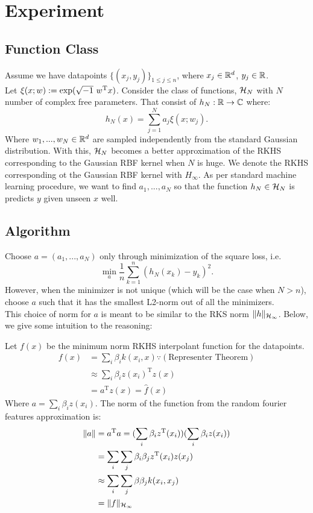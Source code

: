 \documentclass[twoside]{memoir}
\begin{document}
\section{Experiment} \label{sec:RFF_Exp}
\subsection{Function Class}
Assume we have datapoints $\{(x_j, y_j)\}_{1 \leq j \leq n}$, where $x_j \in \mathbb{R}^d$, $y_j \in \mathbb{R}$.\\
Let $\xi(x;w) := \exp(\sqrt{-1} ~ w^{\text{T}} x)$.
Consider the class of functions, $\mathcal{H}_N$ with $N$ number of complex free parameters. That consist of $h_N: \mathbb{R} \rightarrow \mathbb{C}$ where:
\[ h_N(x) = \sum_{j=1}^{N} a_j \xi(x;w_j). \]
Where $w_1,..., w_N \in \mathbb{R}^d$ are sampled independently from the standard Gaussian distribution. With this, $\mathcal{H}_N$ becomes a better approximation of the RKHS corresponding to the Gaussian RBF kernel when $N$ is huge. We denote the RKHS corresponding ot the Gaussian RBF kernel with $H_\infty$. As per standard machine learning procedure, we want to find $a_1, ..., a_N$ so that the function $h_N \in \mathcal{H}_N$ is predicts $y$ given unseen $x$ well.
\subsection{Algorithm}
Choose $a = (a_1,..., a_N)$ only through minimization of the square loss, i.e.
\[ \min_{a} \frac{1}{n} \sum_{k=1}^{n}(h_N(x_k) - y_k)^2. \]
However, when the minimizer is not unique (which will be the case when $N > n$), choose $a$ such that it has the smallest L2-norm out of all the minimizers. \\
This choice of norm for $a$ is meant to be similar to the RKS norm $\lVert h\rVert_{\mathcal{H}_\infty}$. Below, we give some intuition to the reasoning:

	Let $f(x)$ be the minimum norm RKHS interpolant function for the datapoints. 
	\begin{equation*}
	\begin{split}
	f(x) &= \sum_{i}\beta_ik(x_i, x)  \because(\text{Representer Theorem}) \\
	&\approx \sum_{i}\beta_iz(x_i)^\text{T}z(x) \\
	&= a^\text{T}z(x) = \hat{f}(x)
	\end{split}
	\end{equation*}
	Where $a = \sum_{i}\beta_iz(x_i) $.
	The norm of the function from the random fourier features approximation is:
	\begin{equation*}
	\begin{split}
	\lVert a\rVert &=   a^\text{T} a = 
	(\sum_{i}\beta_i z^\text{T}(x_i)) (\sum_{i}\beta_i z(x_i)) \\
	&= \sum_i \sum_j \beta_i \beta_j z^\text{T}(x_i)z(x_j)  \\
	&\approx \sum_i \sum_j \beta \beta_j k(x_i, x_j) \\
	&= \lVert f\rVert_{\mathcal{H}_\infty}
	\end{split}
	\end{equation*}
\end{document}
